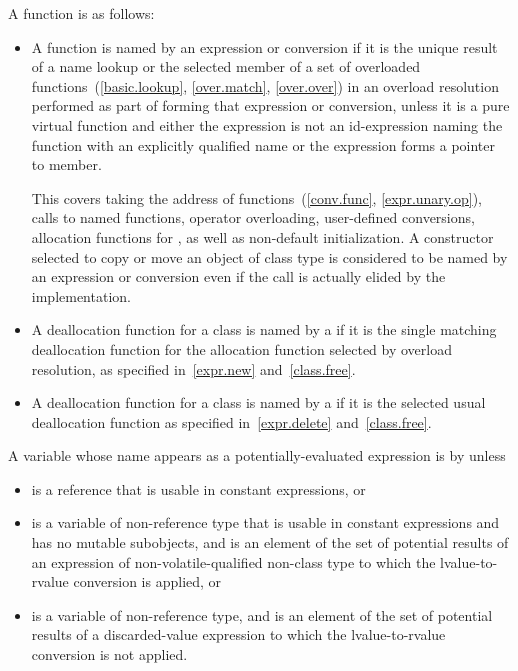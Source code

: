 \pnum
{}%
A function is  as follows:
\begin{itemize}
\item
  A function is named by an expression or conversion
  if it is the unique result of a name lookup or the selected member
  of a set of overloaded functions~(\ref{basic.lookup}, \ref{over.match}, \ref{over.over})
  in an overload resolution performed
  as part of forming that expression or conversion,
  unless it is a pure virtual function and either
  the expression is not an id-expression naming the function with
  an explicitly qualified name or
  the expression forms a pointer to member.
  \begin{note} This covers
  taking the address of functions~(\ref{conv.func}, \ref{expr.unary.op}),
  calls to named functions,
  operator overloading,
  user-defined conversions,
  allocation functions for , as well as
  non-default initialization.
  A constructor selected to copy or move an object of class type
  is considered to be named by an expression or conversion
  even if the call is actually elided by the implementation. \end{note}
\item
  A deallocation function for a class
  is named by a 
  if it is the single matching deallocation function
  for the allocation function selected by overload resolution,
  as specified in~\ref{expr.new} and~\ref{class.free}.
\item
  A deallocation function for a class
  is named by a 
  if it is the selected usual deallocation function
  as specified in~\ref{expr.delete} and~\ref{class.free}.
\end{itemize}

\pnum
A variable  whose name appears as a
potentially-evaluated expression 
is  by  unless
\begin{itemize}
\item
   is a reference that is
  usable in constant expressions, or
\item
   is a variable of non-reference type that is
  usable in constant expressions and has no mutable subobjects, and
   is an element of the set of potential results of an expression
  of non-volatile-qualified non-class type
  to which the lvalue-to-rvalue conversion is applied, or
\item
   is a variable of non-reference type, and
   is an element of the set of potential results
  of a discarded-value expression
  to which the lvalue-to-rvalue conversion is not applied.
\end{itemize}

